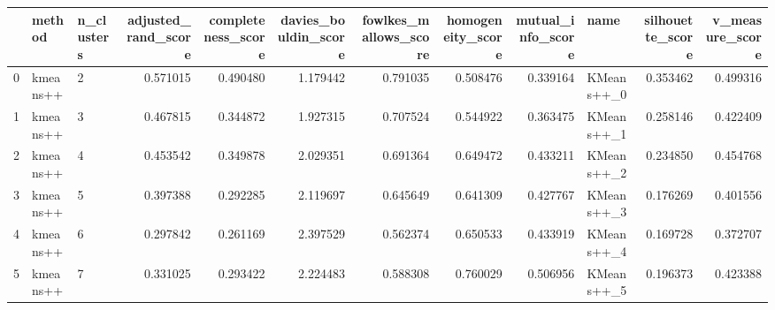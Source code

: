 \begin{tabular}{lllrrrrrrlrr}
\toprule
{} &    method & n\_clusters &  adjusted\_rand\_score &  completeness\_score &  davies\_bouldin\_score &  fowlkes\_mallows\_score &  homogeneity\_score &  mutual\_info\_score &        name &  silhouette\_score &  v\_measure\_score \\
\midrule
0 &  kmeans++ &          2 &             0.571015 &            0.490480 &              1.179442 &               0.791035 &           0.508476 &           0.339164 &  KMeans++\_0 &          0.353462 &         0.499316 \\
1 &  kmeans++ &          3 &             0.467815 &            0.344872 &              1.927315 &               0.707524 &           0.544922 &           0.363475 &  KMeans++\_1 &          0.258146 &         0.422409 \\
2 &  kmeans++ &          4 &             0.453542 &            0.349878 &              2.029351 &               0.691364 &           0.649472 &           0.433211 &  KMeans++\_2 &          0.234850 &         0.454768 \\
3 &  kmeans++ &          5 &             0.397388 &            0.292285 &              2.119697 &               0.645649 &           0.641309 &           0.427767 &  KMeans++\_3 &          0.176269 &         0.401556 \\
4 &  kmeans++ &          6 &             0.297842 &            0.261169 &              2.397529 &               0.562374 &           0.650533 &           0.433919 &  KMeans++\_4 &          0.169728 &         0.372707 \\
5 &  kmeans++ &          7 &             0.331025 &            0.293422 &              2.224483 &               0.588308 &           0.760029 &           0.506956 &  KMeans++\_5 &          0.196373 &         0.423388 \\
\bottomrule
\end{tabular}

